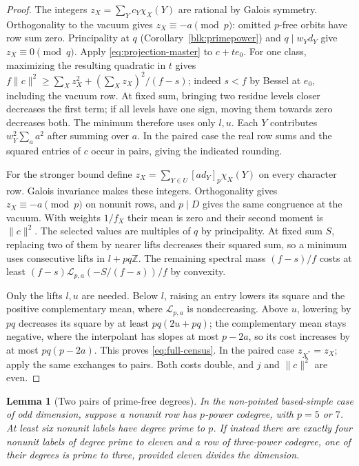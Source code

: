 \documentclass[11pt]{amsart}
\numberwithin{equation}{section}
\newtheorem{lemma}[theorem]{Lemma}
\theoremstyle{definition}
\theoremstyle{plain}
\newcommand{\ZZ}{\mathbb Z}
\begin{document}
\begin{proof}
The integers $z_X=\sum_Yc_Y\chi_X(Y)$ are rational by Galois
symmetry. Orthogonality to the vacuum gives $z_X\equiv-a\pmod p$:
omitted $p$-free orbits have row sum zero. Principality at $q$
(Corollary~\ref{blk:primepower}) and $q\mid w_Yd_Y$ give
$z_X\equiv0\pmod q$. Apply \eqref{eq:projection-master} to $c+te_0$. For one class, maximizing the resulting quadratic in $t$
gives $f\|c\|^2\ge\sum_X z_X^2+(\sum_Xz_X)^2/(f-s)$;
indeed $s<f$ by Bessel at $e_0$, including the vacuum row.
At fixed sum, bringing two residue levels closer decreases the
first term; if all levels have one sign, moving them towards zero
decreases both. The minimum therefore uses only $l,u$.
Each $Y$ contributes $w_Y^2\sum_a a^2$ after summing over $a$.
In the paired case the real row sums and the squared entries of $c$
occur in pairs, giving the indicated rounding.

For the stronger bound define $z_X=\sum_{Y\in U}[ad_Y]_p\chi_X(Y)$
on every character row. Galois invariance makes these integers.
Orthogonality gives $z_X\equiv-a\pmod p$ on nonunit rows, and
$p\mid D$ gives the same congruence at the vacuum. With weights
$1/f_X$ their mean is zero and their second moment is $\|c\|^2$.
The selected values are multiples of $q$ by principality. At fixed
sum $S$, replacing two of them by nearer lifts decreases their
squared sum, so a minimum uses consecutive lifts in $l+pq\ZZ$.
The remaining spectral mass $(f-s)/f$ costs at least
$(f-s)\mathcal L_{p,a}(-S/(f-s))/f$ by convexity.

Only the lifts $l,u$ are needed. Below $l$, raising an entry lowers
its square and the positive complementary mean, where
$\mathcal L_{p,a}$ is nondecreasing. Above $u$, lowering by $pq$
decreases its square by at least $pq(2u+pq)$; the complementary
mean stays negative, where the interpolant has slopes at most
$p-2a$, so its cost increases by at most $pq(p-2a)$.
This proves \eqref{eq:full-census}. In the paired case
$z_{X^*}=z_X$; apply the same exchanges to pairs. Both costs double,
and $j$ and $\|c\|^2$ are even.
\end{proof}
\begin{lemma}[Two pairs of prime-free degrees]\label{odd:two-free}
In the non-pointed based-simple case of odd dimension, suppose a
nonunit row has $p$-power codegree, with $p=5$ or $7$.
At least six nonunit labels have degree prime to $p$. If instead
there are exactly four nonunit labels of degree prime to eleven
and a row of three-power codegree, one of their degrees is prime
to three, provided eleven divides the dimension.
\end{lemma}
\end{document}
